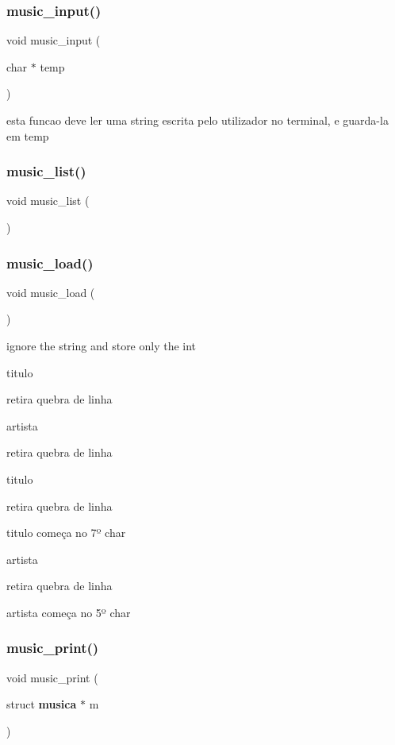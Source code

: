 \subsubsection{music\_input()}
{\footnotesize\ttfamily void music\+\_\+input (\begin{DoxyParamCaption}\item[{char $\ast$}]{temp }\end{DoxyParamCaption})}

esta funcao deve ler uma string escrita pelo utilizador no terminal, e guarda-\/la em temp \mbox{\label{project_8h_a805fc5a774bc1872a74344155c721bd4}} 
\subsubsection{music\_list()}
{\footnotesize\ttfamily void music\+\_\+list (\begin{DoxyParamCaption}{ }\end{DoxyParamCaption})}

\mbox{\label{project_8h_a35fb249f740a3763e67875658fb507ec}} 
\subsubsection{music\_load()}
{\footnotesize\ttfamily void music\+\_\+load (\begin{DoxyParamCaption}{ }\end{DoxyParamCaption})}

ignore the string and store only the int

titulo

retira quebra de linha

artista

retira quebra de linha

titulo

retira quebra de linha

titulo começa no 7º char

artista

retira quebra de linha

artista começa no 5º char \mbox{\label{project_8h_a0593b129f68797b24a9ddbec810a80e9}} 
\subsubsection{music\_print()}
{\footnotesize\ttfamily void music\+\_\+print (\begin{DoxyParamCaption}\item[{struct \textbf{ musica} $\ast$}]{m }\end{DoxyParamCaption})}

